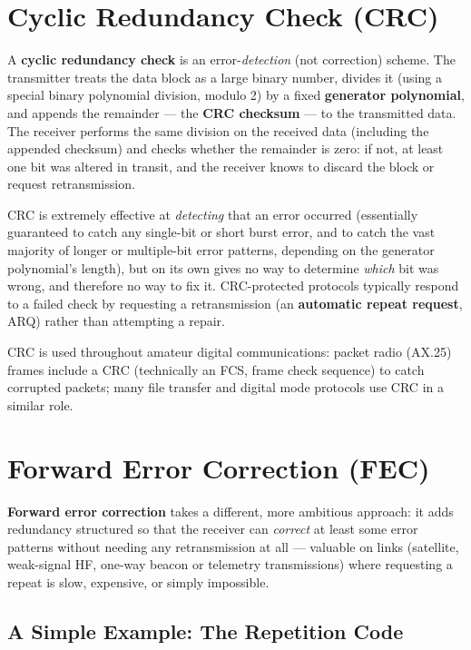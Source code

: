 \section{Cyclic Redundancy Check (CRC)}

A \textbf{cyclic redundancy check} is an error-\emph{detection} (not
correction) scheme. The transmitter treats the data block as a large
binary number, divides it (using a special binary polynomial division,
modulo 2) by a fixed \textbf{generator polynomial}, and appends the
remainder --- the \textbf{CRC checksum} --- to the transmitted data. The
receiver performs the same division on the received data (including the
appended checksum) and checks whether the remainder is zero: if not, at
least one bit was altered in transit, and the receiver knows to discard
the block or request retransmission.

\begin{keyidea}
CRC is extremely effective at \emph{detecting} that an error occurred
(essentially guaranteed to catch any single-bit or short burst error,
and to catch the vast majority of longer or multiple-bit error
patterns, depending on the generator polynomial's length), but on its
own gives no way to determine \emph{which} bit was wrong, and therefore
no way to fix it. CRC-protected protocols typically respond to a failed
check by requesting a retransmission (an \textbf{automatic repeat
request}, ARQ) rather than attempting a repair.
\end{keyidea}

CRC is used throughout amateur digital communications: packet radio
(AX.25) frames include a CRC (technically an FCS, frame check sequence)
to catch corrupted packets; many file transfer and digital mode
protocols use CRC in a similar role.

\section{Forward Error Correction (FEC)}

\textbf{Forward error correction} takes a different, more ambitious
approach: it adds redundancy structured so that the receiver can
\emph{correct} at least some error patterns without needing any
retransmission at all --- valuable on links (satellite, weak-signal HF,
one-way beacon or telemetry transmissions) where requesting a repeat is
slow, expensive, or simply impossible.

\subsection{A Simple Example: The Repetition Code}

